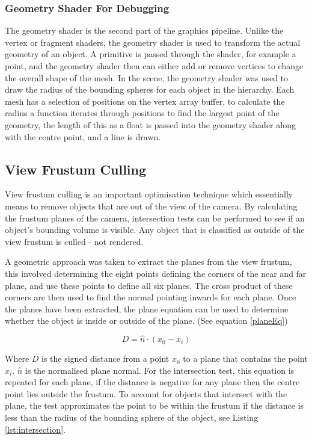 \documentclass[conference]{acmsiggraph}
\begin{document}
\subsubsection{Geometry Shader For Debugging}
The geometry shader is the second part of the graphics pipeline. Unlike the vertex or fragment shaders, the geometry shader is used to transform the actual geometry of an object. A primitive is passed through the shader, for example a point, and the geometry shader then can either add or remove vertices to change the overall shape of the mesh. In the scene, the geometry shader was used to draw the radius of the bounding spheres for each object in the hierarchy. Each mesh has a selection of positions on the vertex array buffer, to calculate the radius a function iterates through positions to find the largest point of the geometry, the length of this as a float is passed into the geometry shader along with the centre point, and a line is drawn.

\subsection{View Frustum Culling}
View frustum culling is an important optimisation technique which essentially means to remove objects that are out of the view of the camera. By calculating the frustum planes of the camera, intersection tests can be performed to see if an object's bounding volume is visible. Any object that is classified as outside of the view frustum is culled - not rendered.

A geometric approach was taken to extract the planes from the view frustum, this involved determining the eight points defining the corners of the near and far plane, and use these points to define all six planes. \cite{lighthouse} The cross product of these corners are then used to find the normal pointing inwards for each plane. Once the planes have been extracted, the plane equation can be used to determine whether the object is inside or outside of the plane. (See equation \ref{planeEq})

\begin{equation} \label{planeEq}
D = \hat{n}\cdot(x_0-x_i)
\end{equation}

Where $D$ is the signed distance from a point $x_0$ to a plane that contains the point $x_i$. $\hat{n}$ is the normalised plane normal. For the intersection test, this equation is repeated for each plane, if the distance is negative for any plane then the centre point lies outside the frustum. To account for objects that intersect with the plane, the test approximates the point to be within the frustum if the distance is less than the radius of the bounding sphere of the object, see Listing \ref{lst:intersection}.
\end{document}
